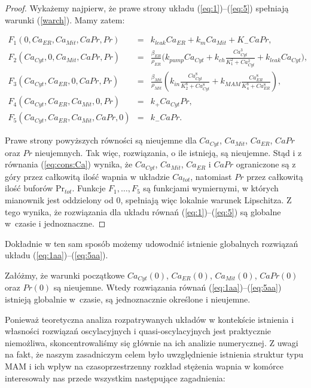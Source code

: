 \begin{proof}
Wykażemy najpierw, że prawe strony układu (\ref{eq:1})--(\ref{eq:5}) spełniają warunki (\ref{warch}). Mamy zatem: 

\begin{eqnarray*}
F_1(0,Ca_{ER},Ca_{Mit}, CaPr, Pr)  &=& k_{leak} Ca_{ER} + k_m Ca_{Mit} 
							+ K_- CaPr, \\
F_2(Ca_{Cyt},0,Ca_{Mit}, CaPr, Pr) &=& 
							\frac{\beta_{ER}}{\rho_{ER}}\Bigg(k_{pump}Ca_{Cyt} 
							+ k_{ch} \frac{Ca_{Cyt}^3}{K_1^2+Ca_{Cyt}^2} 
							+ k_{leak}Ca_{Cyt} \Bigg), \\
F_3(Ca_{Cyt},Ca_{ER},0, CaPr, Pr)	 &=& \frac{\beta_{Mit}}{\rho_{Mit}} 
							\left(k_{in}\frac{Ca_{Cyt}^8}{K_2^8+Ca_{Cyt}^8} 
							+k_{MAM}\frac{Ca_{ER}^8}{K_4^8+Ca_{ER}^8} \right), \\
F_4(Ca_{Cyt},Ca_{ER},Ca_{Mit}, 0, Pr) &=& k_+ Ca_{Cyt}Pr, \\
F_5(Ca_{Cyt},Ca_{ER},Ca_{Mit}, CaPr, 0) &=& k_- CaPr.							
\end{eqnarray*}

\noindent Prawe strony powyższych równości są nieujemne dla $Ca_{Cyt}$, $Ca_{Mit}$, $Ca_{ER}$, $CaPr$ oraz $Pr$ nieujemnych. Tak więc, rozwiązania, o ile istnieją, są nieujemne. Stąd i z równania (\ref{eq:cons:Ca}) wynika, że $Ca_{Cyt}$, $Ca_{Mit}$, $Ca_{ER}$ i $CaPr$ ograniczone są z góry przez całkowitą ilość wapnia w układzie $Ca_{tot}$, natomiast $Pr$ przez całkowitą ilość buforów Pr$_{tot}$. Funkcje $F_1, \ldots,F_5$ są funkcjami wymiernymi, w których mianownik jest oddzielony od $0$,  spełniają więc lokalnie warunek Lipschitza. Z tego wynika, że rozwiązania dla układu równań (\ref{eq:1})--(\ref{eq:5}) są globalne w~czasie i jednoznaczne. \end{proof}

\medskip 

Dokładnie w ten sam sposób możemy udowodnić istnienie globalnych rozwiązań układu (\ref{eq:1aa})--(\ref{eq:5aa}).

\medskip 

\begin{thm} \label{ist2} 
Załóżmy, że warunki początkowe $Ca_{Cyt}(0)$, $Ca_{ER}(0)$, $Ca_{Mit}(0)$, $CaPr(0)$ oraz $Pr(0)$ są nieujemne. Wtedy rozwiązania równań (\ref{eq:1aa})--(\ref{eq:5aa}) istnieją globalnie w~czasie, są jednoznacznie określone i nieujemne. 
\end{thm}


Ponieważ teoretyczna analiza rozpatrywanych układów w kontekście istnienia i własności rozwiązań oscylacyjnych i quasi-oscylacyjnych jest praktycznie niemożliwa, skoncentrowaliśmy się głównie na ich analizie numerycznej.  Z uwagi na fakt, że naszym zasadniczym celem było uwzględnienie istnienia struktur typu MAM i ich wpływ na czasoprzestrzenny rozkład stężenia wapnia w komórce interesowały nas przede wszystkim następujące zagadnienia:

